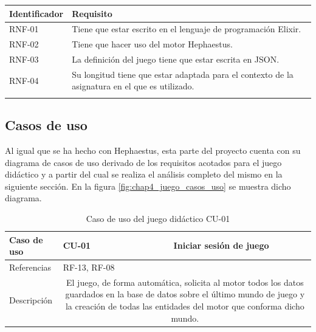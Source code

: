 {\footnotesize
\begin{tabularx}{\textwidth}{|l|X|}
	\hline
	\rowcolor[HTML]{C0C0C0}
	\textbf{Identificador} & \textbf{Requisito} \\ \hline
	RNF-01 & Tiene que estar escrito en el lenguaje de programación Elixir. \\ \hline
	RNF-02 & Tiene que hacer uso del motor Hephaestus. \\ \hline
	RNF-03 & La definición del juego tiene que estar escrita en JSON. \\ \hline
	RNF-04 & Su longitud tiene que estar adaptada para el contexto de la asignatura en el que es utilizado. \\ \hline
	
	\caption{Juego didáctico. Requisitos no funcionales}
	\label{tab:juego-req-nfunc}
\end{tabularx}
}

\subsection{Casos de uso}

Al igual que se ha hecho con Hephaestus, esta parte del proyecto cuenta con su diagrama de casos de uso derivado de los requisitos acotados para el juego didáctico y a partir del cual se realiza el análisis completo del mismo en la siguiente sección. En la figura \ref{fig:chap4_juego_casos_uso} se muestra dicho diagrama.

\begin{table}[H]
	\centering
	\small
	\begin{tabularx}{\linewidth}{|l|cc|}
		\hline
		{\cellcolor[HTML]{C0C0C0} Caso de uso} & \multicolumn{1}{l|}{CU-01} & Iniciar sesión de juego \\ \hline
		{\cellcolor[HTML]{C0C0C0} Referencias} & \multicolumn{2}{l|}{RF-13, RF-08} \\ \hline
		{\cellcolor[HTML]{C0C0C0} Descripción} & \multicolumn{2}{X|}{El juego, de forma automática, solicita al motor todos los datos guardados en la base de datos sobre el último mundo de juego y la creación de todas las entidades del motor que conforma dicho mundo.} \\ \hline
	\end{tabularx}
	
	\vspace{0.5cm}
	\caption{Caso de uso del juego didáctico CU-01}
	\label{tab:juego-cu-01}
\end{table}

